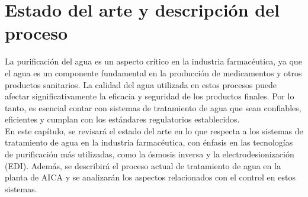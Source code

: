 \chapter{Estado del arte y descripción del proceso}
La purificación del agua es un aspecto crítico en la industria farmacéutica, ya que el agua es un componente
fundamental en la producción de medicamentos y otros productos sanitarios. La calidad del agua utilizada
en estos procesos puede afectar significativamente la eficacia y seguridad de los productos finales.
Por lo tanto, es esencial contar con sistemas de tratamiento de agua que sean confiables, eficientes y cumplan con los estándares regulatorios establecidos.\\

En este capítulo, se revisará el estado del arte en lo que respecta a los sistemas de tratamiento de
agua en la industria farmacéutica, con énfasis en las tecnologías de purificación más utilizadas, como la ósmosis inversa y la electrodesionización (EDI). Además,
se describirá el proceso actual de tratamiento de agua en la planta de AICA y se analizarán los aspectos relacionados con el control en estos sistemas.


